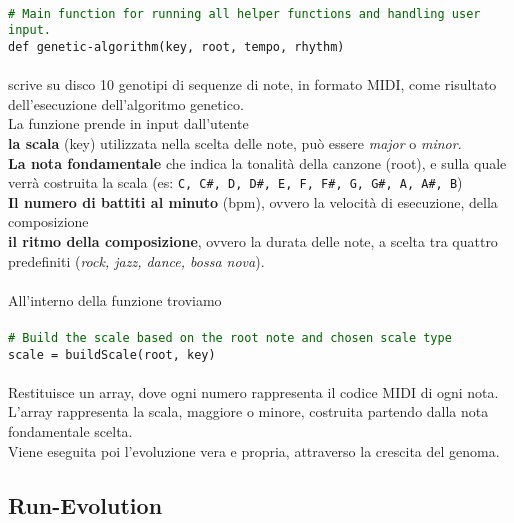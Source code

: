 \documentclass[a4paper,12pt]{report}
\begin{document}
\\
\texttt{\small\textcolor{darkgreen}{\# Main function for running all helper functions and handling user input.}} \\
\texttt{\small def genetic-algorithm(key, root, tempo, rhythm)} \\
\\
scrive su disco 10 genotipi di sequenze di note, in formato MIDI, come risultato dell'esecuzione dell'algoritmo genetico. \\
La funzione prende in input dall'utente \\
\textbf{la scala} (key) utilizzata nella scelta delle note, può essere \textit{major} o \textit{minor}. \\
\textbf{La nota fondamentale} che indica la tonalità della canzone (root), e sulla quale verrà costruita la scala (es: \texttt{C, C\#, D, D\#, E, F, F\#, G, G\#, A, A\#, B}) \\
\textbf{Il numero di battiti al minuto} (bpm), ovvero la velocità di esecuzione, della composizione \\
\textbf{il ritmo della composizione}, ovvero la durata delle note, a scelta tra quattro predefiniti (\textit{rock, jazz, dance, bossa nova}). \\
\\
All'interno della funzione troviamo \\
\\
\texttt{\small\textcolor{darkgreen}{\# Build the scale based on the root note and chosen scale type}} \\
\texttt{\small scale = buildScale(root, key)} \\
\\
Restituisce un array, dove ogni numero rappresenta il codice MIDI di ogni nota. \\
L'array rappresenta la scala, maggiore o minore, costruita partendo dalla nota fondamentale scelta. \\
Viene eseguita poi l'evoluzione vera e propria, attraverso la crescita del genoma.

\subsection{Run-Evolution}
\end{document}
